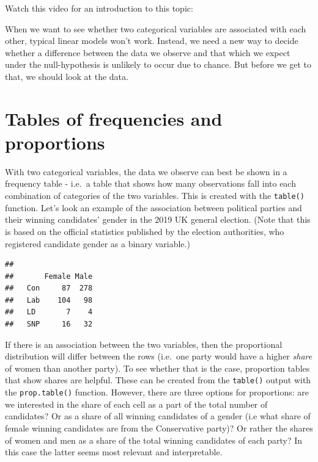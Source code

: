 \documentclass[
]{book}
\newenvironment{Shaded}{\begin{snugshade}}{\end{snugshade}}
\newcommand{\KeywordTok}[1]{\textcolor[rgb]{0.13,0.29,0.53}{\textbf{#1}}}
\newcommand{\NormalTok}[1]{#1}
\newcommand{\OperatorTok}[1]{\textcolor[rgb]{0.81,0.36,0.00}{\textbf{#1}}}
\begin{document}
Watch this video for an introduction to this topic:

When we want to see whether two categorical variables are associated with each other, typical linear models won't work. Instead, we need a new way to decide whether a difference between the data we observe and that which we expect under the null-hypothesis is unlikely to occur due to chance. But before we get to that, we should look at the data.

\hypertarget{tables-of-frequencies-and-proportions}{%
\section{Tables of frequencies and proportions}\label{tables-of-frequencies-and-proportions}}

With two categorical variables, the data we observe can best be shown in a frequency table - i.e.~a table that shows how many observations fall into each combination of categories of the two variables. This is created with the \texttt{table()} function. Let's look an example of the association between political parties and their winning candidates' gender in the 2019 UK general election. (Note that this is based on the official statistics published by the election authorities, who registered candidate gender as a binary variable.)

\begin{Shaded}
\end{Shaded}

\begin{verbatim}
##      
##       Female Male
##   Con     87  278
##   Lab    104   98
##   LD       7    4
##   SNP     16   32
\end{verbatim}

If there is an association between the two variables, then the proportional distribution will differ between the rows (i.e.~one party would have a higher \emph{share} of women than another party). To see whether that is the case, proportion tables that show shares are helpful. These can be created from the \texttt{table()} output with the \texttt{prop.table()} function. However, there are three options for proportions: are we interested in the share of each cell as a part of the total number of candidates? Or as a share of all winning candidates of a gender (i.e what share of female winning candidates are from the Conservative party)? Or rather the shares of women and men as a share of the total winning candidates of each party? In this case the latter seems most relevant and interpretable.
\end{document}
